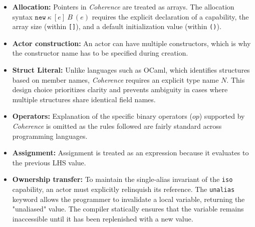 \documentclass[a4paper,12pt,fleqn]{article}
\begin{document}
\begin{itemize}
    \item \textbf{Allocation:} Pointers in \textit{Coherence} are treated as arrays. The allocation syntax $\mathtt{new}\ \kappa \ [e]\ B\ (e)$ requires the explicit declaration of a capability, the array size (within \texttt{[]}), and a default initialization value (within \texttt{()}). 
    \item \textbf{Actor construction:} An actor can have multiple constructors, which is why the constructor name has to be specified during creation.
    \item \textbf{Struct Literal:} Unlike languages such as OCaml, which identifies structures based on member names, \textit{Coherence} requires an explicit type name $N$. This design choice prioritizes clarity and prevents ambiguity in cases where multiple structures share identical field names.
    \item \textbf{Operators:} Explanation of the specific binary operators ($\mathit{op}$) supported by \textit{Coherence} is omitted as the rules followed are fairly standard across programming languages.
    \item \textbf{Assignment:} Assignment is treated as an expression because it evaluates to the previous LHS value.
    \item \textbf{Ownership transfer:} To maintain the single-alias invariant of the \texttt{iso} capability, an actor must explicitly relinquish its reference. The \texttt{unalias} keyword allows the programmer to invalidate a local variable, returning the "unaliased" value. The compiler statically ensures that the variable remains inaccessible until it has been replenished with a new value.
\end{itemize}
\end{document}
